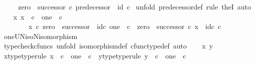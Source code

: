 \begin{isabellebody}
\ \ \ \ {\isasymand}\ {\isacharparenleft}{\kern0pt}zero\ {\isasymamalg}\ successor{\isacharparenright}{\kern0pt}\ {\isasymcirc}\isactrlsub c\ predecessor\ {\isacharequal}{\kern0pt}\ id\ {\isasymnat}\isactrlsub c{\isachardoublequoteclose}\isanewline
%
\isadelimproof
%
\endisadelimproof
%
\isatagproof
{}\isamarkupfalse%
\ {\isacharparenleft}{\kern0pt}unfold\ predecessor{\isacharunderscore}{\kern0pt}def{\isacharcomma}{\kern0pt}\ rule\ theI{\isacharprime}{\kern0pt}{\isacharcomma}{\kern0pt}\ auto{\isacharparenright}{\kern0pt}\isanewline
\ \ \isamarkupfalse%
\ {\isachardoublequoteopen}{\isasymexists}x{\isachardot}{\kern0pt}\ x\ {\isacharcolon}{\kern0pt}\ {\isasymnat}\isactrlsub c\ {\isasymrightarrow}\ one\ {\isasymCoprod}\ {\isasymnat}\isactrlsub c\ {\isasymand}\isanewline
\ \ \ \ \ \ \ \ x\ {\isasymcirc}\isactrlsub c\ zero\ {\isasymamalg}\ successor\ {\isacharequal}{\kern0pt}\ id\isactrlsub c\ {\isacharparenleft}{\kern0pt}one\ {\isasymCoprod}\ {\isasymnat}\isactrlsub c{\isacharparenright}{\kern0pt}\ {\isasymand}\ zero\ {\isasymamalg}\ successor\ {\isasymcirc}\isactrlsub c\ x\ {\isacharequal}{\kern0pt}\ id\isactrlsub c\ {\isasymnat}\isactrlsub c{\isachardoublequoteclose}\isanewline
\ \ \ \ \isamarkupfalse%
\ oneUN{\isacharunderscore}{\kern0pt}iso{\isacharunderscore}{\kern0pt}N{\isacharunderscore}{\kern0pt}isomorphism\ \isamarkupfalse%
\ {\isacharparenleft}{\kern0pt}typecheck{\isacharunderscore}{\kern0pt}cfuncs{\isacharcomma}{\kern0pt}\ unfold\ isomorphism{\isacharunderscore}{\kern0pt}def\ cfunc{\isacharunderscore}{\kern0pt}type{\isacharunderscore}{\kern0pt}def{\isacharcomma}{\kern0pt}\ auto{\isacharparenright}{\kern0pt}\isanewline
{}\isamarkupfalse%
\isanewline
\ \ \isamarkupfalse%
\ x\ y\isanewline
\ \ \isamarkupfalse%
\ x{\isacharunderscore}{\kern0pt}type{\isacharbrackleft}{\kern0pt}type{\isacharunderscore}{\kern0pt}rule{\isacharbrackright}{\kern0pt}{\isacharcolon}{\kern0pt}\ {\isachardoublequoteopen}x\ {\isacharcolon}{\kern0pt}\ {\isasymnat}\isactrlsub c\ {\isasymrightarrow}\ one\ {\isasymCoprod}\ {\isasymnat}\isactrlsub c{\isachardoublequoteclose}\ \ y{\isacharunderscore}{\kern0pt}type{\isacharbrackleft}{\kern0pt}type{\isacharunderscore}{\kern0pt}rule{\isacharbrackright}{\kern0pt}{\isacharcolon}{\kern0pt}\ {\isachardoublequoteopen}y\ {\isacharcolon}{\kern0pt}\ {\isasymnat}\isactrlsub c\ {\isasymrightarrow}\ one\ {\isasymCoprod}\ {\isasymnat}\isactrlsub c{\isachardoublequoteclose}\isanewline
\ \ \isamarkupfalse%

\end{isabellebody}
